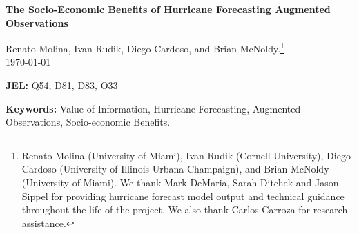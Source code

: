 \documentclass[12pt]{article}%
\begin{document}

\begin{titlepage}
\vspace*{.25cm}
\begin{center}
\renewcommand{\thefootnote}{\fnsymbol{footnote}}

{\noindent\LARGE\bfseries The Socio-Economic Benefits of Hurricane Forecasting Augmented Observations\par}

\vspace{.7cm}
{\Large Renato Molina, Ivan Rudik, Diego Cardoso, and Brian McNoldy.\footnote{Renato Molina (University of Miami), Ivan Rudik (Cornell University), Diego Cardoso (University of Illinois Urbana-Champaign), and Brian McNoldy (University of Miami). We thank Mark DeMaria, Sarah Ditchek and Jason Sippel for providing hurricane forecast model output and technical guidance throughout the life of the project. We also thank Carlos Carroza for research assistance.}} \\

\vspace{.25cm}
{\Large\today}\\
\vspace{.25cm}
\end{center}

\begin{abstract}
\begin{normalsize}
\begin{singlespace}
This study quantifies the socio-economic value of augmented aircraft observations in hurricane forecasting. By linking data-denial experiments for ten U.S. hurricane landfalls (2017–2020) to a structural model of hurricane costs, we isolate the economic returns of in-situ reconnaissance. We find that augmented observations reduce average forecast uncertainty by 0.356 m/s at the 3-day lead time averaged over all counties affected by hurricane-force winds. Implementing this improvement into a valuation framework, we estimate that this precision gain generates over \$36 million in social value per affected county. Given the relative operating costs of reconnaissance, these gains yield a high benefit-to-cost ratio. Ultimately, our findings demonstrate that strategic investment in the NOAA aircraft fleet delivers outsized economic returns in terms of protection against hurricanes.
\end{singlespace}
\end{normalsize}
\end{abstract}



\noindent\textbf{JEL:} Q54, D81, D83, O33

\vspace{.6cm} 

\noindent\textbf{Keywords:} Value of Information, Hurricane Forecasting, Augmented Observations, Socio-economic Benefits.
\setcounter{footnote}{0}


\end{titlepage}
\end{document}
